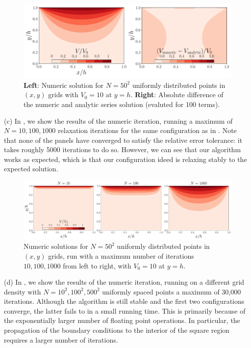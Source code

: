 {\begin{figure}[h!tb]
    \centering
    \includegraphics[width=\linewidth]{part1-comp.pdf}
    \caption{\textbf{Left}: Numeric solution for $N=50^2$ uniformly distributed points in $(x,y)$ grids with $V_0 = 10$ at $y = h$. \textbf{Right}: Absolute difference of the numeric and analytic series solution (evaluted for 100 terms).}
    \label{fig:part1-comp}
\end{figure}

(c) In , we show the results of the numeric iteration, running a maximum of $N = 10,100,1000$ relaxation iterations for the same configuration as in .
Note that none of the panels have converged to satisfy the relative error tolerance: it takes roughly 5000 iterations to do so.
However, we can see that our algorithm works as expected, which is that our configuration ideed is relaxing stably to the expected solution.

\begin{figure}[h!tb]
    \centering
    \includegraphics[width=\linewidth]{part1-iter.pdf}
    \caption{Numeric solutions for $N = 50^2$ uniformly distributed points in $(x,y)$ grids, run with a maximum number of iterations $10,100,1000$ from left to right, with $V_0 = 10$ at $y = h$.}
    \label{fig:part1-iter}
\end{figure}


(d) In , we show the results of the numeric iteration, running on a different grid density with $N = 10^2,100^2,500^2$ uniformly spaced points a maximum of 30,000 iterations.
Although the algorithm is still stable and the first two configurations converge, the latter fails to in a small running time.
This is primarily because of the exponentially larger number of floating point operations.
In particular, the propagation of the boundary conditions to the interior of the square region requires a larger number of iterations.

}

